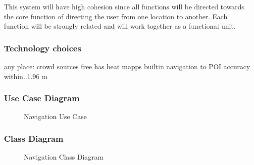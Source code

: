 	This system will have high cohesion since all functions will be directed towards the core function of directing the user from one location to another. Each function will be strongly related and will work together as a functional unit.

\subsubsection{Technology choices}
	any place:
	crowd sources 
	free
	has heat mapps
	builtin navigation to POI
	accuracy within..1.96 m
	

\subsubsection{Use Case Diagram}
	\begin{figure}[h!]
	\caption{Navigation Use Case}
	\end{figure}

\subsubsection{Class Diagram}
	\begin{figure}[h!]
	\caption{Navigation Class Diagram}
	\end{figure}

